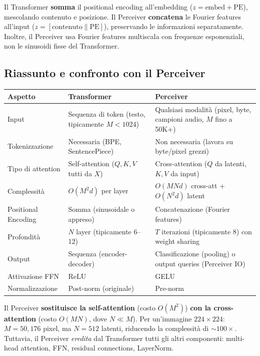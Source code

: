 \documentclass[
  11pt,
]{article}
\begin{document}
\begin{notabox}[title={\textbf{Differenza con il Perceiver}}]
Il Transformer \textbf{somma} il positional encoding all'embedding ($z = \text{embed} + \text{PE}$), mescolando contenuto e posizione. Il Perceiver \textbf{concatena} le Fourier features all'input ($z = [\text{contenuto} \| \text{PE}]$), preservando le informazioni separatamente. Inoltre, il Perceiver usa Fourier features multiscala con frequenze esponenziali, non le sinusoidi fisse del Transformer.
\end{notabox}

\subsection{Riassunto e confronto con il Perceiver}

{\small
\begin{longtable}{@{}p{3cm}p{5cm}p{5cm}@{}}
\toprule
\textbf{Aspetto} & \textbf{Transformer} & \textbf{Perceiver} \\
\midrule\endhead
\bottomrule\endlastfoot
Input & Sequenza di token (testo, tipicamente $M < 1024$) & Qualsiasi modalità (pixel, byte, campioni audio, $M$ fino a 50K+) \\
Tokenizzazione & Necessaria (BPE, SentencePiece) & Non necessaria (lavora su byte/pixel grezzi) \\
Tipo di attention & Self-attention ($Q,K,V$ tutti da $X$) & Cross-attention ($Q$ da latenti, $K,V$ da input) \\
Complessità & $O(M^2 d)$ per layer & $O(MNd)$ cross-att + $O(N^2 d)$ latent \\
Positional Encoding & Somma (sinusoidale o appreso) & Concatenazione (Fourier features) \\
Profondità & $N$ layer (tipicamente 6--12) & $T$ iterazioni (tipicamente 8) con weight sharing \\
Output & Sequenza (encoder-decoder) & Classificazione (pooling) o output queries (Perceiver IO) \\
Attivazione FFN & ReLU & GELU \\
Normalizzazione & Post-norm (originale) & Pre-norm \\
\end{longtable}
}

\begin{notabox}[title={\textbf{Collegamento al Perceiver}}]
Il Perceiver \textbf{sostituisce la self-attention} (costo $O(M^2)$) \textbf{con la cross-attention} (costo $O(MN)$, dove $N \ll M$). Per un'immagine $224 \times 224$: $M = 50{,}176$ pixel, ma $N = 512$ latenti, riducendo la complessità di $\sim\!100\times$. Tuttavia, il Perceiver \emph{eredita} dal Transformer tutti gli altri componenti: multi-head attention, FFN, residual connections, LayerNorm.
\end{notabox}
\end{document}
